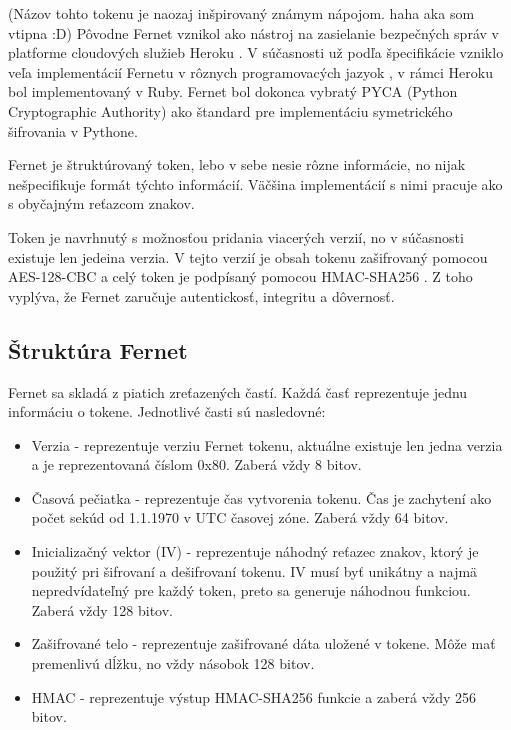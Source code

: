 (Názov tohto tokenu je naozaj inšpirovaný známym nápojom. haha aka som vtipna :D) Pôvodne Fernet vznikol ako nástroj na zasielanie bezpečných správ v platforme cloudových služieb Heroku \cite{fernet_legacy}. V súčasnosti už podľa špecifikácie \cite{fernet_spec} vzniklo veľa implementácií Fernetu v rôznych programovacých jazyok \cite{fenet_cpp, fernet_haskell}, v rámci Heroku bol implementovaný v Ruby. Fernet bol dokonca vybratý PYCA (Python Cryptographic Authority) \cite{pyca_crypto} ako štandard pre implementáciu symetrického šifrovania v Pythone.

Fernet je štruktúrovaný token, lebo v sebe nesie rôzne informácie, no nijak nešpecifikuje formát týchto informácií. Väčšina implementácií s nimi pracuje ako s obyčajným reťazcom znakov. 

Token je navrhnutý s možnosťou pridania viacerých verzií, no v súčasnosti existuje len jedeina verzia. V tejto verzií je obsah tokenu zašifrovaný pomocou AES-128-CBC \cite{aes_cbc} a celý token je podpísaný pomocou HMAC-SHA256 \cite{hmac}. Z toho vyplýva, že Fernet zaručuje autentickosť, integritu a dôvernosť. 

\subsection{Štruktúra Fernet}

Fernet sa skladá z piatich zreťazených častí. Každá časť reprezentuje jednu informáciu o tokene. Jednotlivé časti sú nasledovné:

\begin{itemize}
    \item Verzia - reprezentuje verziu Fernet tokenu, aktuálne existuje len jedna verzia a je reprezentovaná číslom 0x80. Zaberá vždy 8 bitov.
    \item Časová pečiatka - reprezentuje čas vytvorenia tokenu. Čas je zachytení ako počet sekúd od 1.1.1970 v UTC časovej zóne. Zaberá vždy 64 bitov.
    \item Inicializačný vektor (IV) - reprezentuje náhodný reťazec znakov, ktorý je použitý pri šifrovaní a dešifrovaní tokenu. IV musí byť unikátny a najmä nepredvídateľný pre každý token, preto sa generuje náhodnou funkciou. Zaberá vždy 128 bitov.
    \item Zašifrované telo - reprezentuje zašifrované dáta uložené v tokene. Môže mať premenlivú dĺžku, no vždy násobok 128 bitov.
    \item HMAC - reprezentuje výstup HMAC-SHA256 funkcie a zaberá vždy 256 bitov.
\end{itemize}

